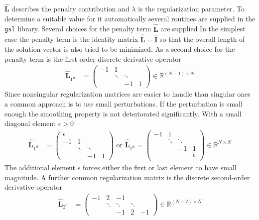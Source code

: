 $\hat{\mathbf{L}}$ describes the penalty contribution and $\lambda$
 is the regularization parameter. To determine a suitable value for it automatically several routines are supplied in the \texttt{gsl} library. Several choices for the penalty term $\hat{\mathbf{L}}$ are supplied
 In the simplest case the penalty term is the identity matrix $\hat{\mathbf{L}} = \hat{\mathbf{I}}$ so that the overall length of the solution vector is also tried to be minimized. As a second choice for the penalty term is the first-order discrete derivative operator \cite{Donatelli2014}
 \begin{align}\label{eq:first_derivative_penalty}
   \hat{\mathbf{L}}_\mathrm{1^{st}} &=
  \begin{pmatrix}
    -1    & 1      &        &  \\
          & \ddots & \ddots &  \\
          &        & -1     & 1
  \end{pmatrix} \in \mathbb{R}^{(N-1)\times N}
\end{align}
Since nonsingular regularization matrices are easier to handle than singular
ones a common approach is to use small perturbations.
If the perturbation is small enough the smoothing property is not deteriorated
significantly. With a small diagonal element $\epsilon > 0$
\begin{align}\label{eq:first_derivative_penalty_plus_epsilon}
   \hat{\mathbf{L}}_\mathrm{1^{st}} &=
  \begin{pmatrix}
  \epsilon & & & \\
    -1    & 1      &        &  \\
          & \ddots & \ddots &  \\
          &        & -1     & 1
  \end{pmatrix} \mbox{ or }  \hat{\mathbf{L}}_\mathrm{1^{st}}  =
  \begin{pmatrix}
    -1    & 1      &        &  \\
          & \ddots & \ddots &  \\
          &        & -1     & 1 \\
          & & & \epsilon \\
  \end{pmatrix} \in \mathbb{R}^{N\times N}
\end{align}
The additional element $\epsilon$ forces either the
first or last element to have small magnitude.
A further common regularization matrix is the discrete second-order derivative \cite{Donatelli2014}
operator
 \begin{align}\label{eq:second_derivative_penalty}
   \hat{\mathbf{L}}_\mathrm{2^{n}} &=
  \begin{pmatrix}
    -1    &  2     & -1     &        &  \\
          & \ddots & \ddots & \ddots &  \\
          &        & -1     & 2      & -1
  \end{pmatrix} \in \mathbb{R}^{(N-2)\times N}
\end{align}
